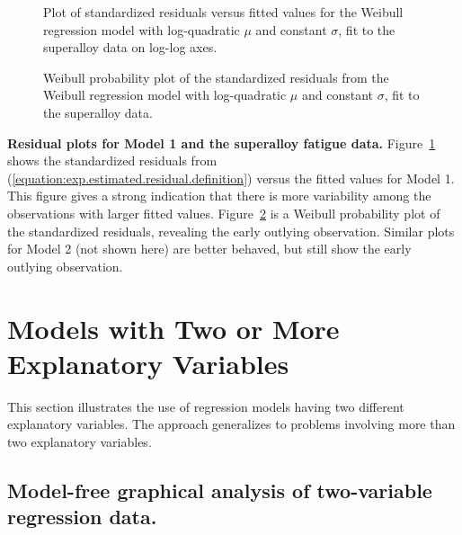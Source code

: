 \begin{figure}
\caption{Plot of standardized residuals
versus fitted values for the Weibull regression model with
log-quadratic $\mu$ and constant $\sigma$,
fit to the superalloy data on log-log axes.}
\label{figure:nf.fitvsres.nf11.weib.ps}
\end{figure}
\begin{figure}
\caption{Weibull probability plot of the standardized residuals
from the Weibull regression model with log-quadratic $\mu$ and
constant $\sigma$, fit to the superalloy data.}
\label{figure:nf.residual.nf11.weib.ps}
\end{figure}

\begin{example}
{\bf Residual plots for Model 1 and the superalloy fatigue data.}
Figure~\ref{figure:nf.fitvsres.nf11.weib.ps} shows the standardized
residuals from (\ref{equation:exp.estimated.residual.definition}) versus
the fitted values for Model 1. This figure gives a strong indication
that there is more variability among the observations with larger
fitted values.  Figure~\ref{figure:nf.residual.nf11.weib.ps} is a
Weibull probability plot of the standardized residuals, revealing
the early outlying observation. Similar plots for Model 2 (not shown
here) are better behaved, but still show the early outlying
observation.
\end{example}

\section{Models with Two or More Explanatory Variables}
\label{section:multiple.reg.models}
This section illustrates the use of regression models having two
different explanatory variables. The approach generalizes 
to problems involving more than two explanatory variables.

\subsection{Model-free graphical analysis of two-variable regression data.}


